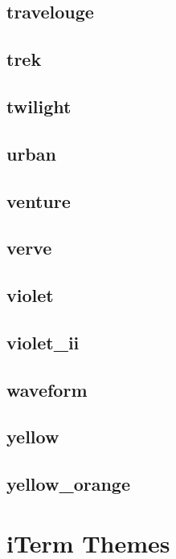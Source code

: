 \subsection{\ttfamily travelouge}
\newpage
\subsection{\ttfamily trek}
\newpage
\subsection{\ttfamily twilight\label{section:default}}
\newpage
\subsection{\ttfamily urban}
\newpage
\subsection{\ttfamily venture}
\newpage
\subsection{\ttfamily verve}
\newpage
\subsection{\ttfamily violet}
\newpage
\subsection{\ttfamily violet\_ii}
\newpage
\subsection{\ttfamily waveform}
\newpage
\subsection{\ttfamily yellow}
\newpage
\subsection{\ttfamily yellow\_orange}
\newpage
\section{iTerm Themes}
